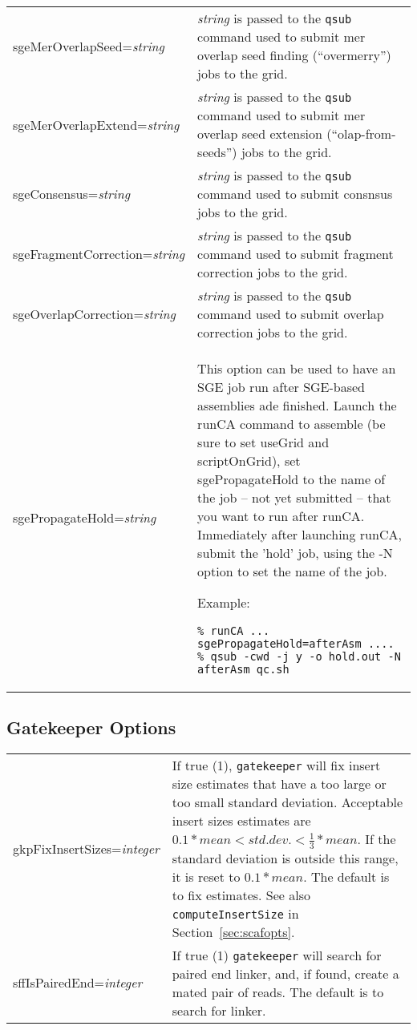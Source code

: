 \documentclass[twoside,11pt]{article}
\begin{document}
\begin{longtable}{lp{3.0in}}
sgeMerOverlapSeed={\it string} &
{\it string} is passed to the {\tt qsub} command used to submit mer overlap seed finding (``overmerry'') jobs to the grid.
\\

sgeMerOverlapExtend={\it string} &
{\it string} is passed to the {\tt qsub} command used to submit mer overlap seed extension (``olap-from-seeds'') jobs to the grid.
\\

sgeConsensus={\it string} &
{\it string} is passed to the {\tt qsub} command used to submit consnsus jobs to the grid.
\\

sgeFragmentCorrection={\it string} &
{\it string} is passed to the {\tt qsub} command used to submit fragment correction jobs to the grid.
\\

sgeOverlapCorrection={\it string} &
{\it string} is passed to the {\tt qsub} command used to submit overlap correction jobs to the grid.
\\

sgePropagateHold={\it string} &

This option can be used to have an SGE job run after SGE-based
assemblies ade finished.  Launch the runCA command to assemble (be
sure to set useGrid and scriptOnGrid), set sgePropagateHold to the
name of the job -- not yet submitted -- that you want to run after
runCA.  Immediately after launching runCA, submit the 'hold' job,
using the -N option to set the name of the job.

Example:
\begin{verbatim}
% runCA ... sgePropagateHold=afterAsm ....
% qsub -cwd -j y -o hold.out -N afterAsm qc.sh
\end{verbatim}
\\
\end{longtable}


\subsection{Gatekeeper Options}
\label{sec:gkpopts}

\begin{longtable}{lp{3.0in}}
gkpFixInsertSizes={\it integer} &
If true (1), {\tt gatekeeper} will fix insert size estimates that have
a too large or too small standard deviation.  Acceptable insert sizes
estimates are $0.1*mean < std.dev. < \frac{1}{3}*mean$.  If the
standard deviation is outside this range, it is reset to $0.1 * mean$.
The default is to fix estimates.
See also {\tt computeInsertSize} in Section~\ref{sec:scafopts}.
\\

sffIsPairedEnd={\it integer} &
If true (1) {\tt gatekeeper} will search for paired end linker,
and, if found, create a mated pair of reads.  The default is to
search for linker.
\end{longtable}
\end{document}
